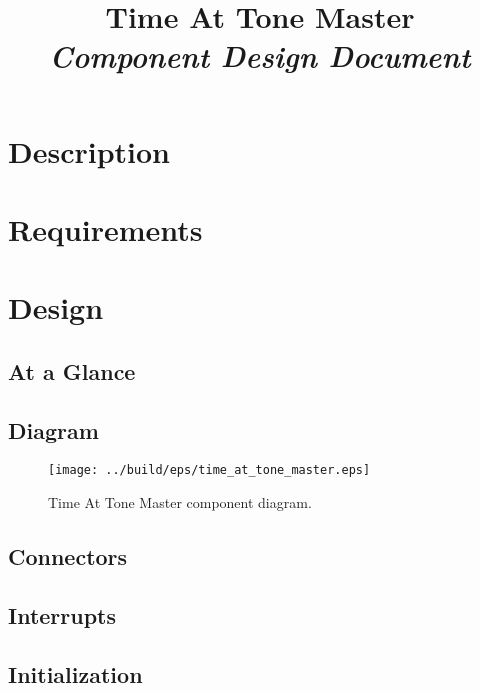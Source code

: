 



\title{\textbf{Time At Tone Master} \\
\large\textit{Component Design Document}}
\date{}
\maketitle

\section{Description}


\section{Requirements}


\section{Design}

\subsection{At a Glance}


\subsection{Diagram}
\begin{figure}[H]
  \texttt{[image: ../build/eps/time\_at\_tone\_master.eps]}
  \caption{Time At Tone Master component diagram.}
\end{figure}

\subsection{Connectors}


\subsection{Interrupts}



\subsection{Initialization}


